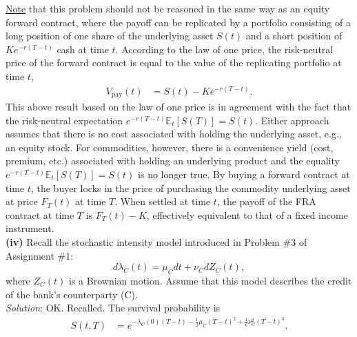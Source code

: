 \documentclass[paper=a4, fontsize=11pt]{scrartcl} %
\numberwithin{equation}{section} %
\numberwithin{figure}{section} %
\numberwithin{table}{section} %
\begin{document}
\underline{Note} that this problem should not be reasoned in the same way as an equity forward contract, where the payoff can be
replicated by a portfolio consisting of a long position of one share of the underlying asset $S(t)$ and a short position
of $Ke^{-r(T-t)}$ cash at time $t$. According to the law of one price, the risk-neutral price of the forward contract 
is equal to the value of the replicating portfolio at time $t$,
\begin{align*}
V_{\text{pay}}(t) &= S(t) - K e^{-r(T-t)}.
\end{align*}
This above result based on the law of one price is in agreement with the fact that the risk-neutral 
expectation $e^{-r(T-t)}\mathbb{E}_t\left[ S(T) \right] = S(t)$. Either approach assumes that there 
is no cost associated with holding the underlying asset, e.g.,
an equity stock. For commodities, however, there is a convenience yield (cost, premium, etc.) associated with holding
an underlying product and the equality $e^{-r(T-t)}\mathbb{E}_t\left[ S(T) \right] = S(t)$ is no longer true. By buying
a forward contract at time $t$, the buyer locks in the price of purchasing the commodity underlying asset at price
$F_T(t)$ at time $T$. When settled at time $t$, the payoff of
the FRA contract at time $T$ is $F_T(t)-K$, effectively equivalent to that of a fixed income instrument.\\



\textbf{(iv)} Recall the stochastic intensity model introduced in Problem \#3 of Assignment \#1:
$$
d\lambda_C (t) = \mu_C dt + \nu_C dZ_C(t),
$$
where $Z_C(t)$ is a Brownian motion. Assume that this model describes the credit of the bank's counterparty (C).\\
\textit{Solution}: OK. Recalled. \smiley{} The survival probability is
\begin{align}\label{survival}
 S(t,T) &= e^{- \lambda_{C}(0) (T-t) - \frac{1}{2}\mu_C  (T-t)^2 +\frac{1}{6}\nu_C^2 (T-t)^3 }.
\end{align}
\end{document}
